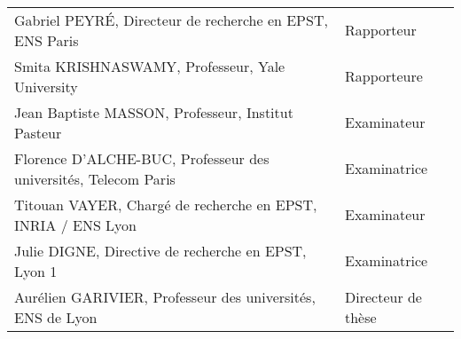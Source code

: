 \begin{titlepage}
	
	 \\
	
	\noindent \begin{tabular}{p{}p{}}
		Gabriel PEYRÉ, Directeur de recherche en EPST, ENS Paris
		& Rapporteur
		\\
		Smita KRISHNASWAMY, Professeur, Yale University 
		& Rapporteure
		\\
		Jean Baptiste MASSON, Professeur, Institut Pasteur 
		& Examinateur 
		\\ 
		Florence D'ALCHE-BUC, Professeur des universités, Telecom Paris 
		& Examinatrice
		\\
		Titouan VAYER, Chargé de recherche en EPST, INRIA / ENS Lyon 
		& Examinateur
		\\
		Julie DIGNE, Directive de recherche en EPST, Lyon 1 
		& Examinatrice
		\\ 
		Aurélien GARIVIER, Professeur des universités, ENS de Lyon 
		& Directeur de thèse
	\end{tabular}
	
\end{titlepage}

\restoregeometry 
